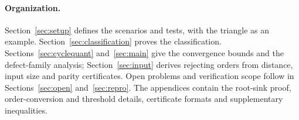 

\paragraph{Organization.}
Section~\ref{sec:setup} defines the scenarios and tests, with the triangle as an example. Section~\ref{sec:classification} proves the classification. Sections~\ref{sec:cyclequant} and~\ref{sec:main} give the convergence bounds and the defect-family analysis; Section~\ref{sec:input} derives rejecting orders from distance, input size and parity certificates. Open problems and verification scope follow in Sections~\ref{sec:open} and~\ref{sec:repro}. The appendices contain the root-sink proof, order-conversion and threshold details, certificate formats and supplementary inequalities.
